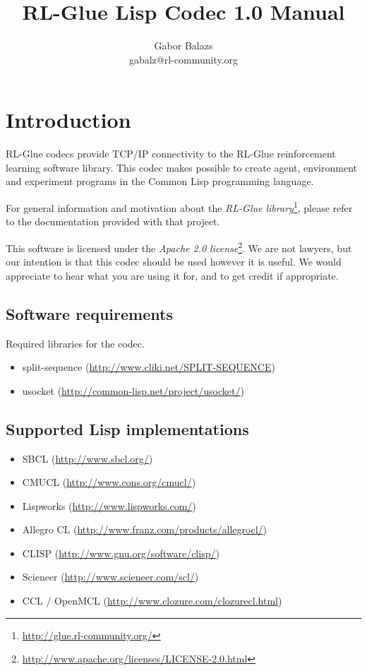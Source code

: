 \documentclass[11pt,a4paper,dvipdfm]{article}
\newcommand{\selfref}[1]{\href{#1}{#1}}
\newcommand{\footref}[2]{\textsl{#1}\footnote{\selfref{#2}}}
\begin{document}
\title{RL-Glue Lisp Codec 1.0 Manual}
\author{Gabor Balazs \\ gabalz@rl-community.org}
\date{}

\maketitle
\setcounter{tocdepth}{2}
\tableofcontents
\newpage


\section{Introduction}

RL-Glue codecs provide TCP/IP connectivity to the RL-Glue reinforcement
learning software library. This codec makes possible to create agent,
environment and experiment programs in the Common Lisp programming language.

For general information and motivation about the
\footref{RL-Glue library}{http://glue.rl-community.org/}, please refer to the
documentation provided with that project.

This software is licensed under the
\footref{Apache 2.0 license}{http://www.apache.org/licenses/LICENSE-2.0.html}.
We are not lawyers, but our intention is that this codec should be used however
it is useful. We would appreciate to hear what you are using it for, and to get
credit if appropriate.

\hypertarget{softreqs}{\subsection{Software requirements}}

Required libraries for the codec.
\begin{itemize}
\item[] split-sequence (\selfref{http://www.cliki.net/SPLIT-SEQUENCE})
\item[] usocket (\selfref{http://common-lisp.net/project/usocket/})
\end{itemize}

\subsection{Supported Lisp implementations}

\begin{itemize}
\item[] SBCL (\selfref{http://www.sbcl.org/})
\item[] CMUCL (\selfref{http://www.cons.org/cmucl/})
\item[] Lispworks (\selfref{http://www.lispworks.com/})
\item[] Allegro CL (\selfref{http://www.franz.com/products/allegrocl/})
\item[] CLISP (\selfref{http://www.gnu.org/software/clisp/})
\item[] Scieneer (\selfref{http://www.scieneer.com/scl/})
\item[] CCL / OpenMCL (\selfref{http://www.clozure.com/clozurecl.html})
\end{itemize}
\end{document}
